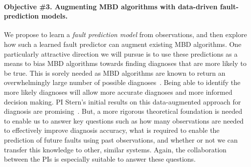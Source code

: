 \documentclass[12pt]{article}
\newcommand{\note}[1]{\textbf{\textit{#1}}}
\begin{document}



\vspace{-0.35cm}
\paragraph{Objective \#3. Augmenting MBD algorithms with data-driven fault-prediction models.} 
We propose to learn a {\em fault prediction model} from observations, and then explore how such a learned fault predictor can augment existing MBD algorithms. 
One particularly attractive direction we will pursue is to use these predictions as a means to bias MBD algorithms towards finding diagnoses that are more likely to be true. This is sorely needed as MBD algorithms are known to return an overwhelmingly large number of possible diagnoses~\cite{stern2015many}. Being able to identify the more likely diagnoses will allow more accurate diagnoses and more informed decision making. PI Stern's initial results on this data-augmented approach for diagnosis are promising~\cite{elmishali2016dataAugmented}. But, a more rigorous theoretical foundation is needed to enable us to answer key questions such as how many observations are needed to effectively improve diagnosis accuracy, what is required to enable the prediction of future faults using past observations, and whether or not we can transfer this knowledge to other, similar systems. Again, the collaboration between the PIs is especially suitable to answer these questions. 
\end{document}
